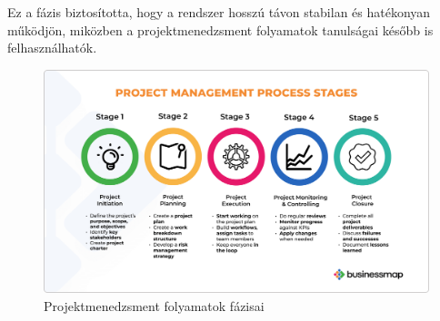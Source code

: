 Ez a fázis biztosította, hogy a rendszer hosszú távon stabilan és hatékonyan működjön, 
miközben a projektmenedzsment folyamatok tanulságai később is felhasználhatók.
\begin{figure}[H]
    \centering
    \includegraphics[width=150mm, keepaspectratio]{figures/project_management_process_stages.png}
    \caption{Projektmenedzsment folyamatok fázisai}
    \label{fig:project_management_process_stages}
\end{figure}
